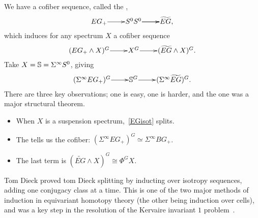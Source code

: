 We have a cofiber sequence, called the ,
\[\xymatrix@1{
	EG_+\ar[r] & S^0\ar[r] S^0\ar[r] & \widetilde{EG},
}\]
which induces for any spectrum $X$ a cofiber sequence
\begin{equation}
\label{EGisot}
\xymatrix@1{
	(EG_+\wedge X)^G\ar[r] & X^G\ar[r] & (\widetilde{EG}\wedge X)^G.
}
\end{equation}
Take $X = \mathbb S = \Sigma^\infty S^0$, giving
\[\xymatrix@1{
	(\Sigma^\infty EG_+)^G\ar[r] & \Sph^G\ar[r] & (\Sigma^\infty\widetilde{EG})^G.
}\]
There are three key observations; one is easy, one is harder, and the one was a major structural theorem.
\begin{itemize}
	\item When $X$ is a suspension spectrum,~\eqref{EGisot} splits.
	\item The  tells us the cofiber: $(\Sigma^\infty EG_+)^G\simeq\Sigma^\infty BG_+$.
	\item The last term is $(\widetilde{EG}\wedge X)^G\cong\Phi^G X$.
\end{itemize}
Tom Dieck proved tom Dieck splitting by inducting over isotropy sequences, adding one conjugacy class at a time.
This is one of the two major methods of induction in equivariant homotopy theory (the other being induction over
cells), and was a key step in the resolution of the Kervaire invariant $1$ problem~\cite{HHR}.

